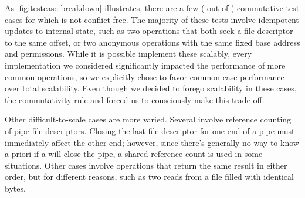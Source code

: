 As \cref{fig:testcase-breakdown} illustrates, there are a few
( out of )
commutative test cases for
which \fs is not conflict-free.
%
The majority of these tests involve idempotent updates to internal
state, such as two  operations that both seek a file
descriptor to the same offset, or two anonymous  operations
with the same fixed base address and permissions.  While it is
possible implement these scalably, every implementation we considered
significantly impacted the performance of more common operations, so
we explicitly chose to favor common-case performance over total
scalability.  Even though we decided to forego scalability in these
cases, the commutativity rule and \tool forced us to consciously make
this trade-off.
%


Other difficult-to-scale cases are more varied.  Several involve
reference counting of pipe file descriptors.  Closing the last file
descriptor for one end of a pipe must immediately affect the other
end; however, since there's generally no way to know a priori if a
 will close the pipe, a shared reference count is used in
some situations.  Other cases involve operations that return the same
result in either order, but for different reasons, such as two reads
from a file filled with identical bytes.



